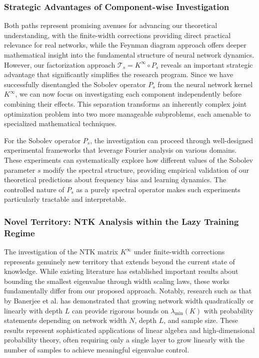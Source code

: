 \documentclass{article}
\begin{document}
\subsubsection{Strategic Advantages of Component-wise Investigation}

Both paths represent promising avenues for advancing our theoretical understanding, with the finite-width corrections providing direct practical relevance for real networks, while the Feynman diagram approach offers deeper mathematical insight into the fundamental structure of neural network dynamics. However, our factorization approach $\mathcal{T}_s = K^{\infty} \circ P_s$ reveals an important strategic advantage that significantly simplifies the research program. Since we have successfully disentangled the Sobolev operator $P_s$ from the neural network kernel $K^{\infty}$, we can now focus on investigating each component independently before combining their effects. This separation transforms an inherently complex joint optimization problem into two more manageable subproblems, each amenable to specialized mathematical techniques.

For the Sobolev operator $P_s$, the investigation can proceed through well-designed experimental frameworks that leverage Fourier analysis on various domains. These experiments can systematically explore how different values of the Sobolev parameter $s$ modify the spectral structure, providing empirical validation of our theoretical predictions about frequency bias and learning dynamics. The controlled nature of $P_s$ as a purely spectral operator makes such experiments particularly tractable and interpretable.

\subsubsection{Novel Territory: NTK Analysis within the Lazy Training Regime}

The investigation of the NTK matrix $K^{\infty}$ under finite-width corrections represents genuinely new territory that extends beyond the current state of knowledge. While existing literature has established important results about bounding the smallest eigenvalue through width scaling laws, these works fundamentally differ from our proposed approach. Notably, research such as that by Banerjee et al. \cite{banerjee2023neural} has demonstrated that growing network width quadratically or linearly with depth $L$ can provide rigorous bounds on $\lambda_{\min}(K)$ with probability statements depending on network width $N$, depth $L$, and sample size. These results represent sophisticated applications of linear algebra and high-dimensional probability theory, often requiring only a single layer to grow linearly with the number of samples to achieve meaningful eigenvalue control.
\end{document}

